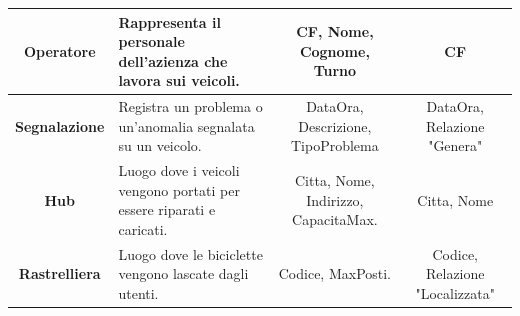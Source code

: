 \documentclass[11pt,a4paper]{article}
\begin{document}
\begin{tabularx}{\linewidth}{| C{0.85} | L{1.10} | C{0.95} | C{0.90} |}
    \textbf{Operatore}                                                                                                      &
    Rappresenta il personale dell'azienza che lavora sui veicoli.                                                           &
    CF, Nome, Cognome, Turno                                                                                                &
    CF                                                                                                                                                                                            \\ \hline

    \textbf{Segnalazione}                                                                                                   &
    Registra un problema o un'anomalia segnalata su un veicolo.                                                             &
    DataOra, Descrizione, TipoProblema                                                                                      &
    DataOra, Relazione "Genera"                                                                                                                                                                   \\ \hline

    \textbf{Hub}                                                                                                            &
    Luogo dove i veicoli vengono portati per essere riparati e caricati.                                                    &
    Citta, Nome, Indirizzo, CapacitaMax.                                                                                    &
    Citta, Nome                                                                                                                                                                                   \\ \hline

    \textbf{Rastrelliera}                                                                                                   &
    Luogo dove le biciclette vengono lascate dagli utenti.                                                                  &
    Codice, MaxPosti.                                                                                                        &
    Codice, Relazione "Localizzata"                                                                                                                                                               \\ \hline


\end{tabularx}
\end{document}
